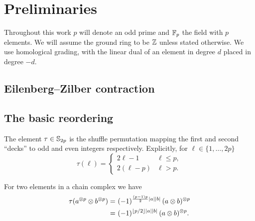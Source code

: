 
\section{Preliminaries}

Throughout this work $p$ will denote an odd prime and ${\mathbb{F}_p}$ the field with $p$ elements.
We will assume the ground ring to be $\mathbb{Z}$ unless stated otherwise.
We use homological grading, with the linear dual of an element in degree $d$ placed in degree $-d$.

\subsection{Eilenberg--Zilber contraction}

\TBW

\subsection{The basic reordering}\label{ss:reordering}

The element $\tau \in \mathbb{S}_{2p}$ is the shuffle permutation mapping the first and second ``decks'' to odd and even integers respectively.
Explicitly, for $\ell \in \{1,\dots,2p\}$
\begin{equation*}
	\tau(\ell) =
	\begin{cases}
		2\ell-1 & \ell \leq p, \\
		2(\ell-p) & \ell > p.
	\end{cases}
\end{equation*}

For two elements in a chain complex we have
\begin{align*}
	\tau(a^{\otimes p} \otimes b^{\otimes p}) =&\
	(-1)^{\frac{(p-1)p}{2}\lvert a\rvert\lvert b\rvert} \, (a \otimes b)^{\otimes p} \\ =&\
	(-1)^{\lfloor p/2\rfloor\lvert a\rvert\lvert b\rvert} \, (a \otimes b)^{\otimes p}.
\end{align*}